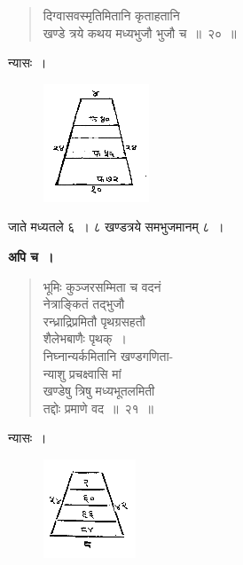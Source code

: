 \documentclass[11pt, openany]{book}
\begin{document}
\newpage%
\begin{quote}
\bqt 
दिग्वासवस्मृतिमितानि कृताहतानि \\
खण्डे त्रये कथय मध्यभुजौ भुजौ च~॥~२०~॥
\end{quote}

 न्यासः~। 
\vspace{-2mm}

\begin{figure}[h!]
    \centering
    \includegraphics[scale=0.8]{graphics/capture26.png}
\end{figure}
\vspace{-2mm}

 जाते मध्यतले ६~। ८ खण्डत्रये समभुजमानम् ८~। \\
\vspace{-2mm}
 
\textbf{अपि च~।} 
\begin{quote}
    \bqt 
भूमिः कुञ्जरसम्मिता च वदनं \\
नेत्राङ्कितं तद्भुजौ \\
रन्ध्राद्रिप्रमितौ पृथग्रसहतौ \\
शैलेभबाणैः पृथक्~।\\
निघ्नान्यर्कमितानि खण्डगणिता-\\
न्याशु प्रचक्ष्वासि मां \\
खण्डेषु त्रिषु मध्यभूतलमिती \\
तद्दोः प्रमाणे वद~॥~२१~॥
\end{quote}

\newpage
 न्यासः~। 
\vspace{-2mm}

\begin{figure}[h!]
    \centering
    \includegraphics[scale=0.8]{graphics/capture27.png}
\end{figure}
\vspace{-3mm}
\end{document}
